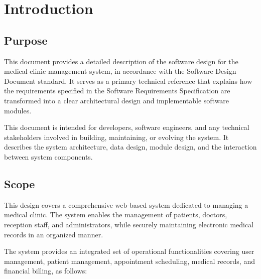 \section{Introduction}

\subsection{Purpose}
This document provides a detailed description of the software design for the medical clinic management system, in accordance with the Software Design Document standard.
It serves as a primary technical reference that explains how the requirements specified in the Software Requirements Specification are transformed into a clear architectural design and implementable software modules.

This document is intended for developers, software engineers, and any technical stakeholders involved in building, maintaining, or evolving the system. It describes the system architecture, data design, module design, and the interaction between system components.

\subsection{Scope}
This design covers a comprehensive web-based system dedicated to managing a medical clinic. The system enables the management of patients, doctors, reception staff, and administrators, while securely maintaining electronic medical records in an organized manner.

The system provides an integrated set of operational functionalities covering user management, patient management, appointment scheduling, medical records, and financial billing, as follows:

